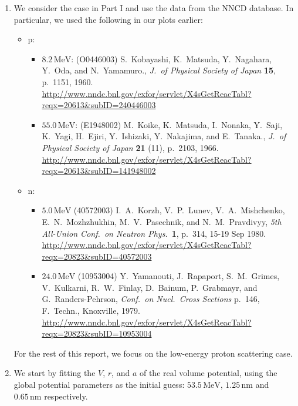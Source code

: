 \documentclass[fleqn, 12pt]{article}
\begin{document}
\begin{enumerate}

\item We consider the case in Part I and use the data from the NNCD database.
  In particular, we used the following in our plots earlier:

  \begin{itemize}
  \item p:
    \begin{itemize}
    \item $8.2\,\mathrm{MeV}$:
      (O0446003) S.\ Kobayashi, K.\ Matsuda, Y.\ Nagahara, Y.\ Oda, and N.\ Yamamuro.,
      \textit{J.\ of Physical Society of Japan} \textbf{15}, p.\ 1151, 1960.
      \url{http://www.nndc.bnl.gov/exfor/servlet/X4sGetReacTabl?reqx=20613&subID=240446003}
    \item $55.0\,\mathrm{MeV}$:
      (E1948002) M.\ Koike, K.\ Matsuda, I.\ Nonaka, Y.\ Saji, K.\ Yagi,
      H.\ Ejiri, Y.\ Ishizaki, Y.\ Nakajima, and E.\ Tanaka.,
      \textit{J.\ of Physical Society of Japan} \textbf{21} (11), p.\ 2103, 1966.
      \url{http://www.nndc.bnl.gov/exfor/servlet/X4sGetReacTabl?reqx=20613&subID=141948002}
    \end{itemize}
  \item n:
    \begin{itemize}
    \item $5.0\,\mathrm{MeV}$
      (40572003) I.\ A.\ Korzh, V.\ P.\ Lunev, V.\ A.\ Mishchenko,
      E.\ N.\ Mozhzhukhin, M.\ V.\ Pasechnik, and N.\ M.\ Pravdivyy,
      \textit{5th All-Union Conf.\ on Neutron Phys.}\ \textbf{1}, p.\ 314, 15-19 Sep 1980.
      \url{http://www.nndc.bnl.gov/exfor/servlet/X4sGetReacTabl?reqx=20823&subID=40572003}
    \item $24.0\,\mathrm{MeV}$
      (10953004) Y.\ Yamanouti, J.\ Rapaport, S.\ M.\ Grimes, V.\ Kulkarni,
      R.\ W.\ Finlay, D.\ Bainum, P.\ Grabmayr, and G.\ Randers-Pehrson,
      \textit{Conf.\ on Nucl.\ Cross Sections} p.\ 146, F.\ Techn., Knoxville, 1979.
      \url{http://www.nndc.bnl.gov/exfor/servlet/X4sGetReacTabl?reqx=20823&subID=10953004}
    \end{itemize}
  \end{itemize}

  For the rest of this report, we focus on the low-energy proton scattering case.

\item We start by fitting the $V$, $r$, and $a$ of the real volume potential,
  using the global potential parameters as the initial guess:
  $53.5\,\mathrm{MeV}$, $1.25\,\mathrm{nm}$ and $0.65\,\mathrm{nm}$
  respectively.


\end{enumerate}
\end{document}
